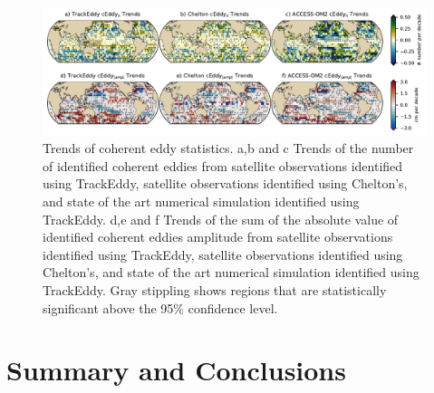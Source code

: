 \documentclass[draft,linenumbers]{agujournal2019}
\begin{document}
	\begin{figure}
	    \centering
	    \includegraphics[width=1\textwidth]{figures/all_trackeddy_trends.pdf}
	    \caption{Trends of coherent eddy statistics. a,b and c Trends of the number of identified coherent eddies from satellite observations identified using TrackEddy, satellite observations identified using Chelton's, and state of the art numerical simulation identified using TrackEddy. d,e and f Trends of the sum of the absolute value of identified coherent eddies amplitude from satellite observations identified using TrackEddy, satellite observations identified using Chelton's, and state of the art numerical simulation identified using TrackEddy. Gray stippling shows regions that are statistically significant above the 95\% confidence level.
		}
	    \label{fig:eddy_stats_trends}
	\end{figure}
	
	\section{Summary and Conclusions}	
	
	\acknowledgments
	
	
	
\end{document}
